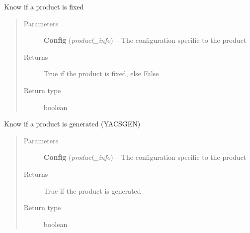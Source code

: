 \documentclass[a4paper,10pt,english]{sphinxmanual}
\begin{document}
\begin{fulllineitems}
\label{commands/apidoc/src:src.product.product_is_fixed}
Know if a product is fixed
\begin{quote}\begin{description}
\item[{Parameters}] \leavevmode
\textbf{Config} (\emph{product\_info}) -- The configuration specific to 
the product

\item[{Returns}] \leavevmode
True if the product is fixed, else False

\item[{Return type}] \leavevmode
boolean

\end{description}\end{quote}

\end{fulllineitems}


\begin{fulllineitems}
\label{commands/apidoc/src:src.product.product_is_generated}
Know if a product is generated (YACSGEN)
\begin{quote}\begin{description}
\item[{Parameters}] \leavevmode
\textbf{Config} (\emph{product\_info}) -- The configuration specific to 
the product

\item[{Returns}] \leavevmode
True if the product is generated

\item[{Return type}] \leavevmode
boolean

\end{description}\end{quote}

\end{fulllineitems}

\end{document}
